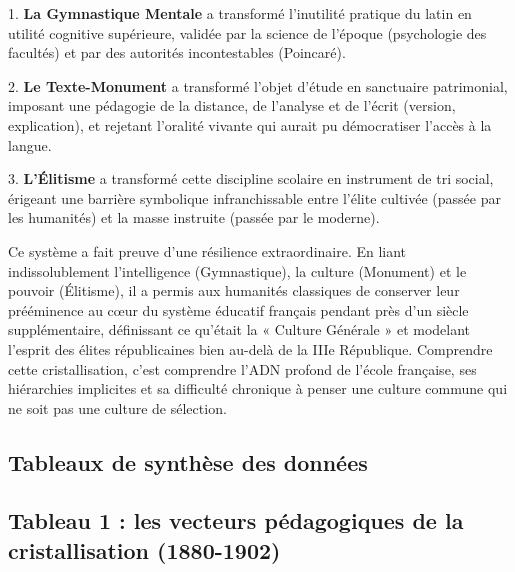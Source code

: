 1. \textbf{La Gymnastique Mentale} a transformé l'inutilité pratique du latin en utilité cognitive
supérieure, validée par la science de l'époque (psychologie des facultés) et par des autorités
incontestables (Poincaré).

2. \textbf{Le Texte-Monument} a transformé l'objet d'étude en sanctuaire patrimonial, imposant une
pédagogie de la distance, de l'analyse et de l'écrit (version, explication), et rejetant l'oralité
vivante qui aurait pu démocratiser l'accès à la langue.

3. \textbf{L'Élitisme} a transformé cette discipline scolaire en instrument de tri social, érigeant
une barrière symbolique infranchissable entre l'élite cultivée (passée par les humanités) et la
masse instruite (passée par le moderne).

Ce système a fait preuve d'une résilience extraordinaire. En liant indissolublement l'intelligence
(Gymnastique), la culture (Monument) et le pouvoir (Élitisme), il a permis aux humanités classiques
de conserver leur prééminence au cœur du système éducatif français pendant près d'un siècle
supplémentaire, définissant ce qu'était la « Culture Générale » et modelant l'esprit des élites
républicaines bien au-delà de la IIIe République. Comprendre cette cristallisation, c'est comprendre
l'ADN profond de l'école française, ses hiérarchies implicites et sa difficulté chronique à penser
une culture commune qui ne soit pas une culture de sélection.



\subsection{Tableaux de synthèse des données}



\subsection{Tableau 1 : les vecteurs pédagogiques de la cristallisation (1880-1902)}

